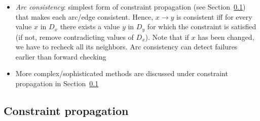 \begin{itemize}
\begin{enumerate}
\begin{itemize}
			\item \textit{Arc consistency}: simplest form of constraint propagation (see Section~\ref{sec:constraint_propagation}) that makes each arc/edge consistent. Hence, $x\to y$ is consistent iff for every value $x$ in $D_x$ there exists a value $y$ in $D_y$ for which the constraint is satisfied (if not, remove contradicting values of $D_x$). Note that if $x$ has been changed, we have to recheck all its neighbors. Arc consistency can detect failures earlier than forward checking
			\item More complex/sophisticated methods are discussed under constraint propagation in Section~\ref{sec:constraint_propagation}
		\end{itemize}
	\end{enumerate}   
\end{itemize}
\subsection{Constraint propagation}
\label{sec:constraint_propagation}
